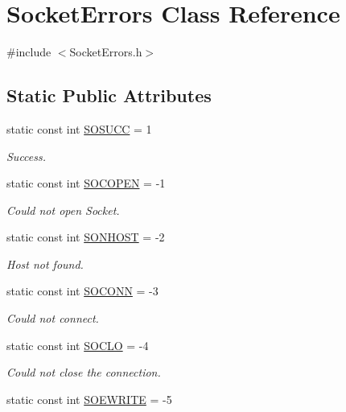 \hypertarget{class_socket_errors}{
\section{\-Socket\-Errors \-Class \-Reference}
\label{class_socket_errors}
}


{\ttfamily \#include $<$\-Socket\-Errors.\-h$>$}

\subsection*{\-Static \-Public \-Attributes}
\begin{DoxyCompactItemize}
\item 
static const int \hyperlink{class_socket_errors_aef601a9a9a2a3b7b354833d7d7845315}{\-S\-O\-S\-U\-C\-C} = 1
\begin{DoxyCompactList}\small\item\em \-Success. \end{DoxyCompactList}\item 
static const int \hyperlink{class_socket_errors_a66d33f33f1a5dd255a188ee31d3474da}{\-S\-O\-C\-O\-P\-E\-N} = -\/1
\begin{DoxyCompactList}\small\item\em \-Could not open \-Socket. \end{DoxyCompactList}\item 
static const int \hyperlink{class_socket_errors_a46ef9f2c12a6d05f7cd190b6eb51bb83}{\-S\-O\-N\-H\-O\-S\-T} = -\/2
\begin{DoxyCompactList}\small\item\em \-Host not found. \end{DoxyCompactList}\item 
static const int \hyperlink{class_socket_errors_a28dc96b2bf49ce93cadd9e050bf2a40e}{\-S\-O\-C\-O\-N\-N} = -\/3
\begin{DoxyCompactList}\small\item\em \-Could not connect. \end{DoxyCompactList}\item 
static const int \hyperlink{class_socket_errors_a276fff8b55c0fff7083a6f8af86897b4}{\-S\-O\-C\-L\-O} = -\/4
\begin{DoxyCompactList}\small\item\em \-Could not close the connection. \end{DoxyCompactList}\item 
static const int \hyperlink{class_socket_errors_afaf22588eba15c91ef59d92ef473c2da}{\-S\-O\-E\-W\-R\-I\-T\-E} = -\/5

\end{DoxyCompactItemize}
